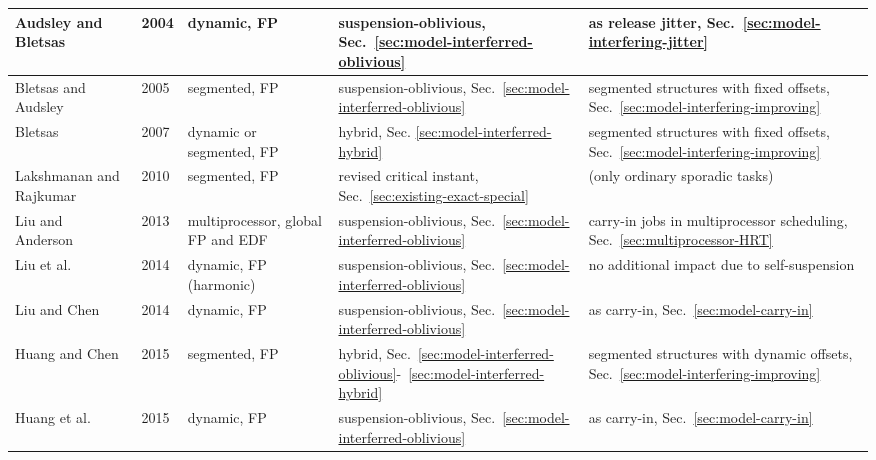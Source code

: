 \begin{table}[h]
{\begin{tabular}{||C{2.5cm}|C{1cm}|C{3cm}||C{5cm}|C{5cm}|}
\hline
Audsley and Bletsas~\cite{ECRTS-AudsleyB04,RTAS-AudsleyB04} & 2004 & dynamic, FP& suspension-oblivious, Sec.~\ref{sec:model-interferred-oblivious}& as release jitter, Sec.~\ref{sec:model-interfering-jitter}  \\%
\hline 
Bletsas and Audsley~\cite{RTCSA-BletsasA05} & 2005 & segmented, FP& suspension-oblivious, Sec.~\ref{sec:model-interferred-oblivious}& segmented structures with fixed offsets, Sec.~\ref{sec:model-interfering-improving}\\%
\hline
Bletsas~\cite[Chapter 5.4]{bletsas:thesis} & 2007 & dynamic or segmented, FP& hybrid, Sec. \ref{sec:model-interferred-hybrid}&segmented structures with fixed offsets, Sec.~\ref{sec:model-interfering-improving} \\%
\hline 
Lakshmanan and Rajkumar~\cite{LR:rtas10} & 2010 & segmented, FP&
revised critical instant, Sec.~\ref{sec:existing-exact-special} &
(only ordinary sporadic tasks) \\%
\hline
Liu and Anderson~\cite{DBLP:conf/ecrts/LiuA13} & 2013 & multiprocessor, global FP and EDF &  suspension-oblivious, Sec.~\ref{sec:model-interferred-oblivious}& carry-in jobs in multiprocessor scheduling, Sec.~\ref{sec:multiprocessor-HRT} \\%
\hline 
Liu et al. \cite{DBLP:conf/ecrts/LiuCH014} & 2014 & dynamic, FP (harmonic)& suspension-oblivious, Sec.~\ref{sec:model-interferred-oblivious}& no additional impact due to self-suspension\\%
\hline 
Liu and Chen~\cite{LiuChen:rtss2014} & 2014 & dynamic, FP& suspension-oblivious, Sec.~\ref{sec:model-interferred-oblivious}& as carry-in, Sec.~\ref{sec:model-carry-in}\\%
\hline
Huang and Chen \cite{Huang:multiseg}& 2015 & segmented, FP& hybrid, Sec.~\ref{sec:model-interferred-oblivious}-~\ref{sec:model-interferred-hybrid} & segmented structures with dynamic offsets, Sec.~\ref{sec:model-interfering-improving}\\%
\hline
Huang et al.~\cite{huangpass:dac2015} & 2015 & dynamic, FP& suspension-oblivious, Sec.~\ref{sec:model-interferred-oblivious}& as carry-in,  Sec.~\ref{sec:model-carry-in}\\%

\end{tabular}}
\end{table}
